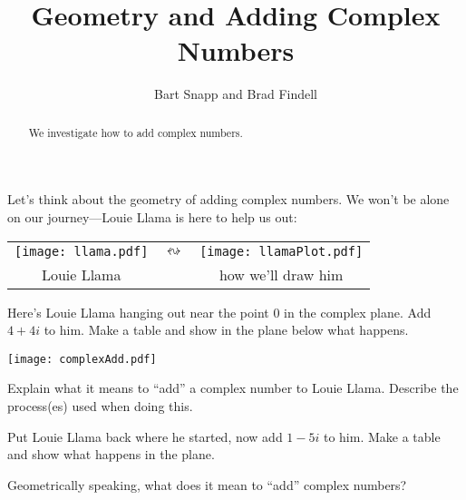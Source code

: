 \documentclass[nooutcomes]{ximera}
\title{Geometry and Adding Complex Numbers}
\author{Bart Snapp and Brad Findell}
\begin{document}
\begin{abstract}
  We investigate how to add complex numbers.
\end{abstract}
\maketitle

\label{A:complexAddition}


Let's think about the geometry of adding complex numbers. We won't be
alone on our journey---Louie Llama is here to help
us out:
\begin{image}
\begin{tabular}{ccc}
\texttt{[image: llama.pdf]} & 
\qquad $\leftrightsquigarrow$\qquad & 
\texttt{[image: llamaPlot.pdf]}\\
Louie Llama & & how we'll draw him
\end{tabular}
\end{image}

\begin{problem} 
Here's Louie Llama hanging out near the point $0$ in the complex
plane. Add $4+4i$ to him. Make a table and show in the plane below what happens.
\begin{image}
\texttt{[image: complexAdd.pdf]}
\end{image}
\end{problem}

\begin{problem}
Explain what it means to ``add'' a complex number to Louie
Llama. Describe the process(es) used when doing this.
\end{problem}


\begin{problem} 
Put Louie Llama back where he started, now add $1-5i$ to him.  Make a
table and show what happens in the plane.
\end{problem}


\begin{problem} 
Geometrically speaking, what does it mean to ``add'' complex numbers?
\end{problem}
\end{document}
